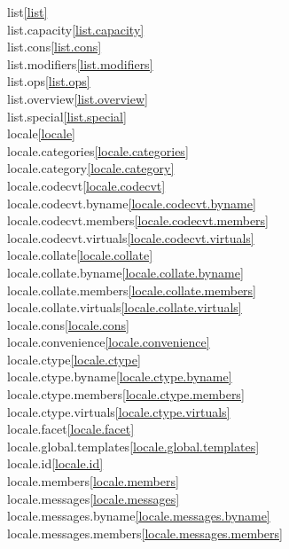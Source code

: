 \begin{multicols}{2}
list\quad\ref{list}\\
list.capacity\quad\ref{list.capacity}\\
list.cons\quad\ref{list.cons}\\
list.modifiers\quad\ref{list.modifiers}\\
list.ops\quad\ref{list.ops}\\
list.overview\quad\ref{list.overview}\\
list.special\quad\ref{list.special}\\
locale\quad\ref{locale}\\
locale.categories\quad\ref{locale.categories}\\
locale.category\quad\ref{locale.category}\\
locale.codecvt\quad\ref{locale.codecvt}\\
locale.codecvt.byname\quad\ref{locale.codecvt.byname}\\
locale.codecvt.members\quad\ref{locale.codecvt.members}\\
locale.codecvt.virtuals\quad\ref{locale.codecvt.virtuals}\\
locale.collate\quad\ref{locale.collate}\\
locale.collate.byname\quad\ref{locale.collate.byname}\\
locale.collate.members\quad\ref{locale.collate.members}\\
locale.collate.virtuals\quad\ref{locale.collate.virtuals}\\
locale.cons\quad\ref{locale.cons}\\
locale.convenience\quad\ref{locale.convenience}\\
locale.ctype\quad\ref{locale.ctype}\\
locale.ctype.byname\quad\ref{locale.ctype.byname}\\
locale.ctype.members\quad\ref{locale.ctype.members}\\
locale.ctype.virtuals\quad\ref{locale.ctype.virtuals}\\
locale.facet\quad\ref{locale.facet}\\
locale.global.templates\quad\ref{locale.global.templates}\\
locale.id\quad\ref{locale.id}\\
locale.members\quad\ref{locale.members}\\
locale.messages\quad\ref{locale.messages}\\
locale.messages.byname\quad\ref{locale.messages.byname}\\
locale.messages.members\quad\ref{locale.messages.members}\\

\end{multicols}
